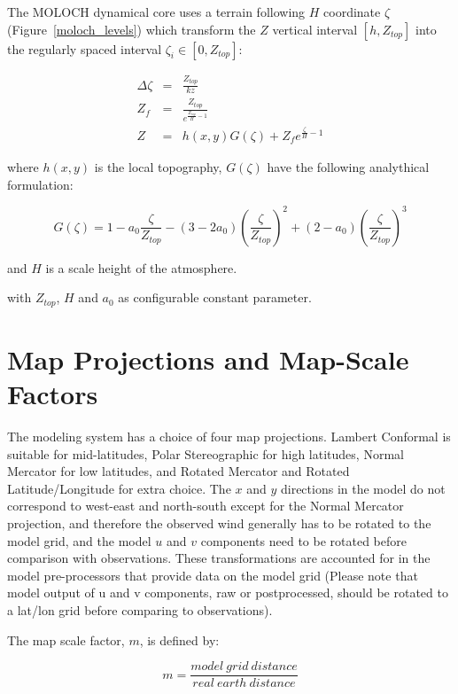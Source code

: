 The \ac{MOLOCH} dynamical core uses a terrain following $H$ coordinate
$\zeta$ (Figure~\ref{moloch_levels}) which transform the $Z$ vertical
interval $[h, Z_{top}]$ into the regularly spaced interval $\zeta_i
\in [0,Z_{top}]$:

\begin{eqnarray}
  \Delta \zeta &=& \frac{Z_{top}}{kz} \\
  Z_f &=& \frac{Z_{top}}{e^{\frac{Z_{top}}{H}-1}} \\
  Z &=& h(x,y) G(\zeta) + Z_f e^{\frac{\zeta}{H}-1}
\end{eqnarray}

where $h(x,y)$ is the local topography, $G(\zeta)$ have the
following analythical formulation:

\begin{equation}
G(\zeta) = 1 - a_0 \frac{\zeta}{Z_{top}} -
       (3 - 2 a_0)\left( \frac{\zeta}{Z_{top}} \right)^2 +
       (2 - a_0) \left( \frac{\zeta}{Z_{top}} \right)^3
\end{equation}

and $H$ is a scale height of the atmosphere.

with $Z_{top}$, $H$ and $a_0$ as configurable constant parameter.

\section{Map Projections and Map-Scale Factors}
The modeling system has a
choice of four map projections. Lambert Conformal is suitable for mid-latitudes,
Polar Stereographic for high latitudes, Normal Mercator for low latitudes, and
Rotated Mercator and Rotated Latitude/Longitude for extra choice.
The $x$ and $y$ directions in the model do
not correspond to west-east and north-south except for the Normal Mercator
projection, and therefore the observed wind generally has to be rotated to the
model grid, and the model $u$ and $v$ components need to be rotated before
comparison with observations. These transformations are accounted for in the
model pre-processors that provide data on the model grid (Please note that
model output of u and v components, raw or postprocessed, should be rotated to a
lat/lon grid before comparing to observations).

The map scale factor, $m$, is defined by:

\begin{equation}
  m = \frac{model\:grid\:distance}{real\:earth\:distance}
\end{equation}

